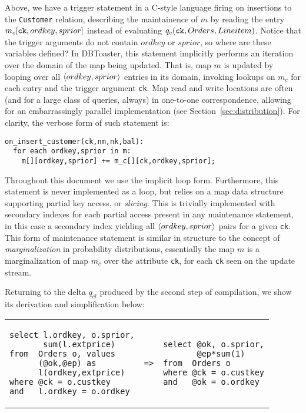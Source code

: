 Above, we have a trigger statement in a C-style language firing on insertions to
the {\tt Customer} relation, describing the maintainence of $m$ by reading the
entry $m_c[\mbox{{\tt ck}},ordkey,sprior]$ instead of evaluating $q_c(\mbox{{\tt
ck}}, Orders, Lineitem)$. Notice that the trigger arguments do not contain
$ordkey$ or $sprior$, so where are these variables defined? In DBToaster, this
statement implicitly performs an iteration over the domain of the map being
updated. That is, map $m$ is updated by looping over all ${\langle ordkey,sprior\rangle}$
entries in its domain, invoking lookups on $m_c$ for each entry and the trigger
argument {\tt ck}. Map read and write locations are often (and for a large class
of queries, always) in one-to-one correspondence, allowing for an embarrassingly
parallel implementation (see Section~\ref{sec:distribution}). For clarity, the
verbose form of such statement is:

\begin{verbatim}
on_insert_customer(ck,nm,nk,bal):
  for each ordkey,sprior in m:
    m[][ordkey,sprior] += m_c[][ck,ordkey,sprior];
\end{verbatim}

\noindent Throughout this document we use the implicit loop form.
Furthermore, this statement is never implemented as a loop, but relies on a map
data structure supporting partial key access, or \textit{slicing}. This is
trivially implemented with secondary indexes for each partial access present in
any maintenance statement, in this case a secondary index yielding all
${\langle ordkey,sprior\rangle}$ pairs for a given \texttt{ck}.
This form of maintenance statement is similar in structure to the concept of
\textit{marginalization} in probability distributions, essentially the map $m$
is a marginalization of map $m_c$ over the attribute \texttt{ck}, for each
\texttt{ck} seen on the update stream.

Returning to the delta $q_{cl}$ produced by the second step of compilation, we
show its derivation and simplification below: 

\vspace{1mm}
\hspace{-5mm}
\begin{tabular}{lcl}
\begin{minipage}{1.5in}
\begin{verbatim}
select l.ordkey, o.sprior,
       sum(l.extprice)
from  Orders o, values
      (@ok,@ep) as
      l(ordkey,extprice)
where @ck = o.custkey
and   l.ordkey = o.ordkey
\end{verbatim}
\end{minipage}
&
{\tt =>}
&
\hspace{-2mm}
\begin{minipage}{1.3in}
\begin{verbatim}
select @ok, o.sprior,
       @ep*sum(1)
from  Orders o
where @ck = o.custkey
and   @ok = o.ordkey
\end{verbatim}
\end{minipage}
\end{tabular}


